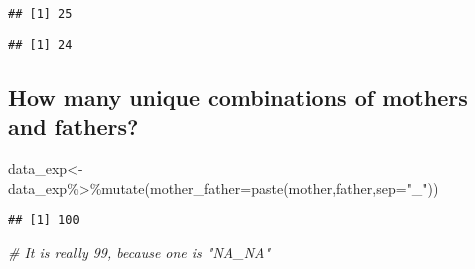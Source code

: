 \documentclass[
]{article}
\newenvironment{Shaded}{\begin{snugshade}}{\end{snugshade}}
\newcommand{\AttributeTok}[1]{\textcolor[rgb]{0.77,0.63,0.00}{#1}}
\newcommand{\CommentTok}[1]{\textcolor[rgb]{0.56,0.35,0.01}{\textit{#1}}}
\newcommand{\FunctionTok}[1]{\textcolor[rgb]{0.00,0.00,0.00}{#1}}
\newcommand{\NormalTok}[1]{#1}
\newcommand{\OtherTok}[1]{\textcolor[rgb]{0.56,0.35,0.01}{#1}}
\newcommand{\SpecialCharTok}[1]{\textcolor[rgb]{0.00,0.00,0.00}{#1}}
\newcommand{\StringTok}[1]{\textcolor[rgb]{0.31,0.60,0.02}{#1}}
\begin{document}
\begin{verbatim}
## [1] 25
\end{verbatim}

\begin{Shaded}
\end{Shaded}

\begin{verbatim}
## [1] 24
\end{verbatim}

\hypertarget{how-many-unique-combinations-of-mothers-and-fathers}{%
\subsection{How many unique combinations of mothers and
fathers?}\label{how-many-unique-combinations-of-mothers-and-fathers}}

\begin{Shaded}
\begin{Highlighting}[]
\NormalTok{data\_exp}\OtherTok{\textless{}{-}}\NormalTok{data\_exp}\SpecialCharTok{\%\textgreater{}\%}\FunctionTok{mutate}\NormalTok{(}\AttributeTok{mother\_father=}\FunctionTok{paste}\NormalTok{(mother,father,}\AttributeTok{sep=}\StringTok{"\_"}\NormalTok{))}
\end{Highlighting}
\end{Shaded}

\begin{Shaded}
\end{Shaded}

\begin{verbatim}
## [1] 100
\end{verbatim}

\begin{Shaded}
\begin{Highlighting}[]
\CommentTok{\# It is really 99, because one is "NA\_NA"}
\end{Highlighting}
\end{Shaded}
\end{document}
